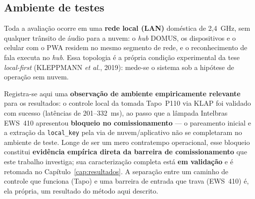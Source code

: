 \subsection{Ambiente de testes}\label{sec:ambiente}

Toda a avaliação ocorre em uma \textbf{rede local (LAN)} doméstica de 2,4~GHz, sem
qualquer trânsito de áudio para a nuvem: o \textit{hub} DOMUS, os dispositivos e o celular
com o PWA residem no mesmo segmento de rede, e o reconhecimento de fala executa no
\textit{hub}. Essa topologia é a própria condição experimental da tese \textit{local-first}
(KLEPPMANN \textit{et al.}, 2019): mede-se o sistema sob a hipótese de operação sem nuvem.

Registra-se aqui uma \textbf{observação de ambiente empiricamente relevante} para os
resultados: o controle local da tomada Tapo~P110 via KLAP foi validado com sucesso
(latências de 201--332~ms), ao passo que a lâmpada Intelbras EWS~410 apresentou
\textbf{bloqueio no comissionamento} --- o pareamento inicial e a extração da
\texttt{local\_key} pela via de nuvem/aplicativo não se completaram no ambiente de teste.
Longe de ser um mero contratempo operacional, esse bloqueio constitui \textbf{evidência
empírica direta da barreira de comissionamento} que este trabalho investiga; sua
caracterização completa está \textbf{em validação} e é retomada no
Capítulo~\ref{cap:resultados}. A separação entre um caminho de controle que funciona
(Tapo) e uma barreira de entrada que trava (EWS~410) é, ela própria, um resultado do
método aqui descrito.
